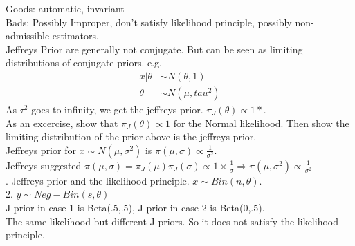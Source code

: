 \documentclass[12pt]{article}
\begin{document}
\noindent
Goods: automatic, invariant\\
Bads: Possibly Improper, don't satisfy likelihood principle, possibly non-admissible estimators.\\

\noindent
Jeffreys Prior are generally not conjugate. But can be seen as limiting distributions of conjugate priors. e.g. 
\begin{align*}
  x|\theta &\sim N(\theta,1) \\
  \theta &\sim N(\mu,tau^2)
\end{align*}
As $\tau^2$ goes to infinity, we get the jeffreys prior.
$\pi_J(\theta) \propto 1*$. \\

\noindent
As an excercise, show that $\pi_J(\theta) \propto 1$ for the Normal likelihood. Then show the limiting distribution of the prior above is the jeffreys prior.\\

\noindent
Jeffreys prior for $x \sim N(\mu,\sigma^2)$ is $\pi(\mu,\sigma) \propto \frac{1}{\sigma^2}$.\\

\noindent
Jeffreys suggested $\pi(\mu,\sigma) = \pi_J(\mu)\pi_J(\sigma) \propto 1 \times \frac{1}{\sigma} \Rightarrow \pi(\mu,\sigma^2) \propto \frac{1}{\sigma^2}$\\

. Jeffreys prior and the likelihood principle. $x \sim Bin(n,\theta)$.\\
2. $y \sim Neg-Bin(s,\theta)$\\
J prior in case 1 is Beta(.5,.5), J prior in case 2 is Beta(0,.5). \\
The same likelihood but different J priors. So it does not satisfy the likelihood principle.\\
\end{document}
